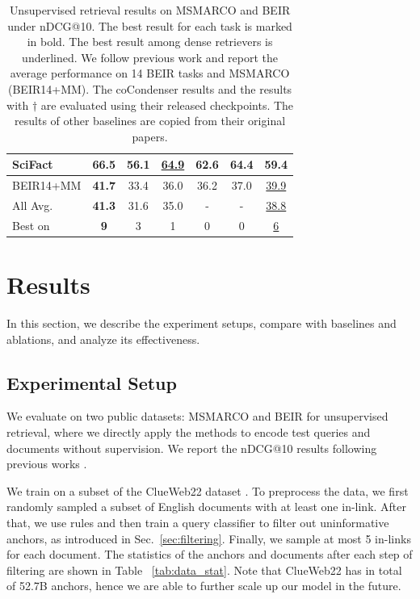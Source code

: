 \begin{table}[t]
{\begin{tabular}{@{}l c | c c c c | c}
  SciFact       & \bf 66.5 & 56.1 & \underline{64.9} & 62.6 & 64.4 & 59.4 \\ 
  \midrule
  BEIR14+MM     & \bf 41.7 & 33.4 & 36.0 & 36.2 & 37.0 & \underline{39.9} \\
  All Avg.      & \bf 41.3 & 31.6 & 35.0 & - & - & \underline{38.8} \\
  Best on       & \bf 9 & 3 & 1 & 0 & 0 & \underline{6} \\
        \bottomrule
    \end{tabular}}
\caption{Unsupervised retrieval results on MSMARCO and BEIR under nDCG@10. The best result for each task is marked in bold. The best result among dense retrievers is underlined. We follow previous work \cite{contriever} and report the average performance on 14 BEIR tasks and MSMARCO (BEIR14+MM). The coCondenser results and the results with $\dagger$ are evaluated using their released checkpoints. The results of other baselines are copied from their original papers.
}
\label{tab:beir}
\end{table}






\section{Results}
In this section, we describe the experiment setups, compare \anchordrours with baselines and ablations, and analyze its effectiveness.

\subsection{Experimental Setup}
We evaluate \anchordrours on two public datasets: MSMARCO \cite{MSMARCO} and BEIR \cite{beir} for unsupervised retrieval, where we directly apply the methods to encode test queries and documents without supervision.
We report the nDCG@10 results following previous works \cite{contriever,QExt}.

 We train \anchordrours on a subset of the ClueWeb22 dataset \cite{clueweb}. To preprocess the data, we first randomly sampled a subset of English documents with at least one in-link. 
After that, we use rules and then train a query classifier to filter out uninformative anchors, as introduced in Sec.~\ref{sec:filtering}.
Finally, we sample at most 5 in-links for each document.
The statistics of the anchors and documents after each step of filtering are shown in Table ~\ref{tab:data_stat}. 
Note that ClueWeb22 has in total of 52.7B anchors, hence we are able to further scale up our model in the future.

